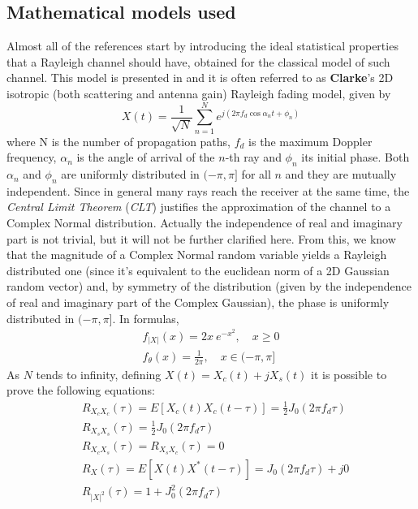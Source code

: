 \subsection{Mathematical models used} %
\label{subsec:math_models}

Almost all of the references start by introducing the ideal statistical properties that a Rayleigh channel should have, obtained for the classical model of such channel. This model is presented in \cite{clarke} and it is often referred to as \textbf{Clarke}'s 2D isotropic (both scattering and antenna gain) Rayleigh fading model, given by%
%
\begin{equation}
X(t) = \frac{1}{\sqrt{N}} \sum_{n=1}^{N} e^{j(2\pi f_d \cos \alpha_n t + \phi_n)}
\end{equation}%
%
where N is the number of propagation paths, $f_d$ is the maximum Doppler frequency, $\alpha_n$ is the angle of arrival of the $n$-th ray and $\phi_n$ its initial phase. Both $\alpha_n$ and $\phi_n$ are uniformly distributed in $(-\pi,\pi]$ for all $n$ and they are mutually independent. Since in general many rays reach the receiver at the same time, the \textit{Central Limit Theorem} (\textit{CLT}) justifies the approximation of the channel to a Complex Normal distribution. Actually the independence of real and imaginary part is not trivial, but it will not be further clarified here. From this, we know that the magnitude of a Complex Normal random variable yields a Rayleigh distributed one (since it's equivalent to the euclidean norm of a 2D Gaussian random vector) and, by symmetry of the distribution (given by the independence of real and imaginary part of the Complex Gaussian), the phase is uniformly distributed in $(-\pi,\pi]$. In formulas,%
%
\begin{subequations}
\begin{align}
	f_{|X|}(x) = 2x \ e^{-x^2}, \quad x \geq 0\\
	f_{\theta}(x) = \frac{1}{2\pi}, \quad x \in (-\pi,\pi]
\end{align}
\end{subequations}%
%
As $N$ tends to infinity, defining $X(t) = X_c(t) + jX_s(t)$ it is possible to prove the following equations:%
%
\begin{subequations}
\begin{align}
&R_{X_cX_c}(\tau) = E[X_c(t)X_c(t-\tau)] = \frac{1}{2} J_0(2\pi f_d\tau)\\
&R_{X_sX_s}(\tau) = \frac{1}{2} J_0(2\pi f_d\tau)\\
&R_{X_cX_s}(\tau) = R_{X_sX_c}(\tau) = 0\\
&R_X(\tau) = E[X(t) X^*(t-\tau)] = J_0(2\pi f_d \tau) + j0\\
&R_{|X|^2}(\tau) = 1 + J_0^2(2\pi f_d \tau)
\end{align}
\end{subequations}%
